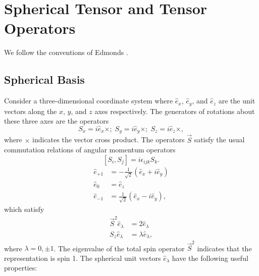 \documentclass{book}[letterpaper,12pt]
\begin{document}
\chapter{Spherical Tensor and Tensor Operators}
\label{app:tensors}
\thispagestyle{headings}
We follow the conventions of Edmonds \cite{edmonds1996angular}. 
\section{Spherical Basis}
Consider a three-dimensional coordinate system where $\hat{e}_x$, $\hat{e}_y$, and $\hat{e}_z$ are the unit vectors along the $x$, $y$, and $z$ axes respectively. The generators of rotations about these three axes are the operators 
\begin{equation}
S_x=i\hat{e}_x\times;\;S_y=i\hat{e}_y\times;\;S_z=i\hat{e}_z\times,
\end{equation}
where $\times$ indicates the vector cross product. The operators $\vec{S}$ satisfy the usual commutation relations of angular momentum operators
\begin{equation}
\left[S_i,S_j\right]=i\epsilon_{ijk}S_k.
\end{equation}
\begin{equation}
\begin{split}
\hat{e}_{+1}&=-\frac{1}{\sqrt{2}}\left(\hat{e}_x+i\hat{e}_y\right)\\
\hat{e}_0&=\hat{e}_z\\
\hat{e}_{-1}&=\frac{1}{\sqrt{2}}\left(\hat{e}_x-i\hat{e}_y\right),
\end{split}
\end{equation}
which satisfy
\begin{equation}
\begin{split}
\vec{S}^2\hat{e}_\lambda&=2\hat{e}_\lambda\\
S_z\hat{e}_\lambda&=\lambda\hat{e}_\lambda,
\end{split}
\end{equation}
where $\lambda=0,\pm 1$. The eigenvalue of the total spin operator $\vec{S}^2$ indicates that the representation is spin 1. The spherical unit vectors $\hat{e}_\lambda$ have the following useful properties:
\end{document}
